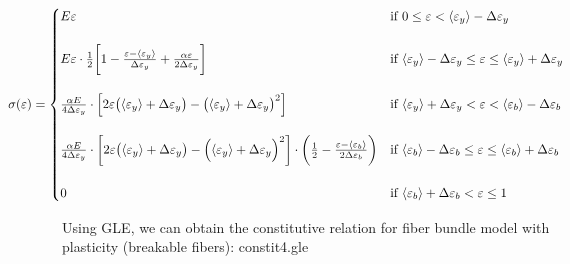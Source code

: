 \documentclass{article}
\newcommand{\eps}{\varepsilon}
\newcommand{\avg}[1]{\langle #1 \rangle}
\newcommand{\dey}{\Delta \varepsilon_y}
\newcommand{\deb}{\Delta \varepsilon_b}
\begin{document}
\begin{equation*}
\hspace*{-1.5cm}
\sigma(\eps) =
    \begin{cases} 
        E \eps 
        & \text{if } 0 \leq \eps < \avg{\eps_y} - \dey \\ \\
        E \eps \cdot \frac{1}{2} \bigg[ 1 - \frac{\eps - \avg{\eps_y}}{\dey} + \frac{\alpha \eps}{2 \dey} \bigg] 
        & \text{if } \avg{\eps_y} - \dey \leq \eps \leq \avg{\eps_y} + \dey \\ \\
        \frac{\alpha E}{4 \dey} \cdot \Bigl[ 2\eps \bigl( \avg{\eps_y} + \dey \bigr) - \bigl( \avg{\eps_y} + \dey \bigr)^2 \Bigr] 
        & \text{if } \avg{\eps_y} + \dey < \eps < \avg{\eps_b} - \deb \\ \\
        \frac{\alpha E}{4 \dey} \cdot \bigg[ 2\eps \bigl( \avg{\eps_y} + \dey \bigr) - \Bigl( \avg{\eps_y} + \dey \Bigr)^2 \bigg] \cdot \bigg( \frac{1}{2} - \frac{\eps - \avg{\eps_b}}{2 \deb} \bigg) 
        & \text{if } \avg{\eps_b} - \deb \leq \eps \leq \avg{\eps_b} + \deb \\ \\
        0 
        & \text{if } \avg{\eps_b} + \deb < \eps \leq 1
    \end{cases}
\end{equation*}

Using GLE, we can obtain the constitutive relation for fiber bundle model with plasticity (breakable fibers): constit4.gle

\end{document}
